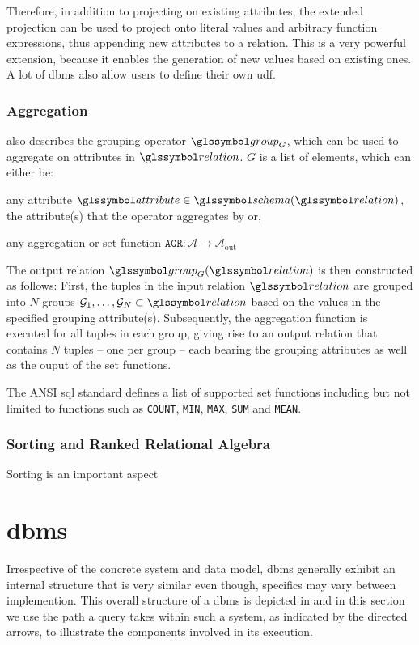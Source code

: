 Therefore, in addition to projecting on existing attributes, the extended projection can be used to project onto literal values and arbitrary function expressions, thus appending new attributes to a relation. This is a very powerful extension, because it enables the generation of new values based on existing ones. A lot of \acrshort{dbms} also allow users to define their own \acrfull{udf}.

\subsubsection{Aggregation}

\cite{Garcia:2009Database} also describes the grouping operator $\group_{G}$, which can be used to aggregate on attributes in $\relation$. $G$ is a list of elements, which can either be:
\begin{enumerate*}[label=(\roman*)]
    \item any attribute $\attribute \in \schema(\relation)$, the attribute(s) that the operator aggregates by or,
    \item any aggregation or set function $\texttt{AGR} \colon \mathcal{A} \rightarrow \mathcal{A}_{\text{out}}$
\end{enumerate*}

The output relation $\group_G (\relation)$ is then constructed as follows: First, the tuples in the input relation  $\relation$ are grouped into $N$ groups $\mathcal{G}_1, \ldots,\mathcal{G}_N \subset \relation$ based on the values in the specified grouping attribute(s). Subsequently, the aggregation function is executed for all tuples in each group, giving rise to an output relation that contains $N$ tuples --  one per group -- each bearing the grouping attributes as well as the ouput of the set functions.

The ANSI \acrshort{sql} standard \cite{XOpen:1996SQL} defines a list of supported set functions including but not limited to functions such as \texttt{COUNT}, \texttt{MIN}, \texttt{MAX}, \texttt{SUM} and \texttt{MEAN}.

\subsubsection{Sorting and Ranked Relational Algebra}

Sorting is an important aspect 

\section{\acrfull{dbms}}
Irrespective of the concrete system and data model, \acrshort{dbms} generally exhibit an internal structure that is very similar \cite{Petrov:2019Database,Hellerstein:2007Architecture} even though, specifics may vary between implemention. This overall structure of a \acrshort{dbms} is depicted in  and in this section we use the path a query takes within such a system, as indicated by the directed arrows, to illustrate the components involved in its execution.

